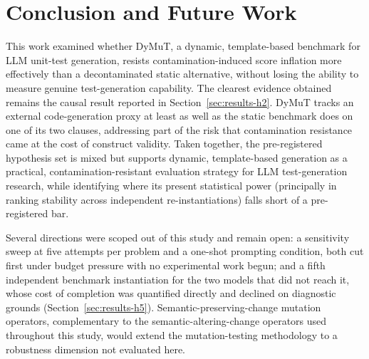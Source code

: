 \section{Conclusion and Future Work}
\label{sec:conclusion}

This work examined whether DyMuT, a dynamic, template-based benchmark for LLM unit-test generation, resists contamination-induced score inflation more effectively than a decontaminated static alternative, without losing the ability to measure genuine test-generation capability. The clearest evidence obtained remains the causal result reported in Section~\ref{sec:results-h2}. DyMuT tracks an external code-generation proxy at least as well as the static benchmark does on one of its two clauses, addressing part of the risk that contamination resistance came at the cost of construct validity. Taken together, the pre-registered hypothesis set is mixed but supports dynamic, template-based generation as a practical, contamination-resistant evaluation strategy for LLM test-generation research, while identifying where its present statistical power (principally in ranking stability across independent re-instantiations) falls short of a pre-registered bar.

Several directions were scoped out of this study and remain open: a sensitivity sweep at five attempts per problem and a one-shot prompting condition, both cut first under budget pressure with no experimental work begun; and a fifth independent benchmark instantiation for the two models that did not reach it, whose cost of completion was quantified directly and declined on diagnostic grounds (Section~\ref{sec:results-h5}). Semantic-preserving-change mutation operators, complementary to the semantic-altering-change operators used throughout this study, would extend the mutation-testing methodology to a robustness dimension not evaluated here.
